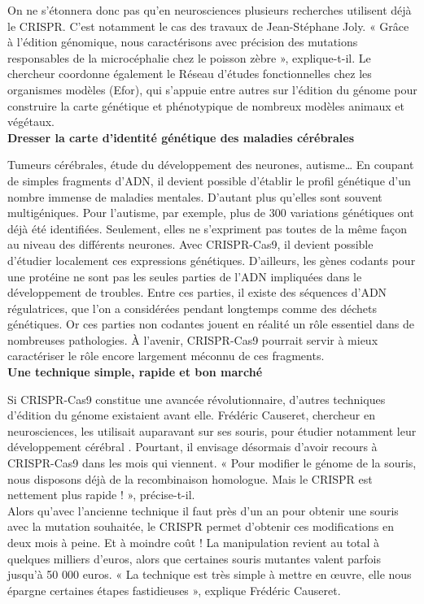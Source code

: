 \documentclass[8pt]{article}
\begin{document}
On ne s’étonnera donc pas qu’en neurosciences plusieurs recherches utilisent déjà le CRISPR. C’est notamment le cas des travaux de Jean-Stéphane Joly. « Grâce à l’édition génomique, nous caractérisons avec précision des mutations responsables de la microcéphalie chez le poisson zèbre », explique-t-il. Le chercheur coordonne également le Réseau d’études fonctionnelles chez les organismes modèles (Efor), qui s’appuie entre autres sur l’édition du génome pour construire la carte génétique et phénotypique de nombreux modèles animaux et végétaux.  \\

\textbf{Dresser la carte d’identité génétique des maladies cérébrales}

Tumeurs cérébrales, étude du développement des neurones, autisme… En coupant de simples fragments d’ADN, il devient possible d’établir le profil génétique d’un nombre immense de maladies mentales. D’autant plus qu’elles sont souvent multigéniques. Pour l’autisme, par exemple, plus de 300 variations génétiques ont déjà été identifiées. Seulement, elles ne s’expriment pas toutes de la même façon au niveau des différents neurones. Avec CRISPR-Cas9, il devient possible d'étudier localement ces expressions génétiques. D’ailleurs, les gènes codants pour une protéine ne sont pas les seules parties de l’ADN impliquées dans le développement de troubles. Entre ces parties, il existe des séquences d’ADN régulatrices, que l’on a considérées pendant longtemps comme des déchets génétiques. Or ces parties non codantes jouent en réalité un rôle essentiel dans de nombreuses pathologies. À l’avenir, CRISPR-Cas9 pourrait servir à mieux caractériser le rôle encore largement méconnu de ces fragments.  \\

\textbf{Une technique simple, rapide et bon marché}

Si CRISPR-Cas9 constitue une avancée révolutionnaire, d’autres techniques d’édition du génome existaient avant elle. Frédéric Causeret, chercheur en neurosciences, les utilisait auparavant sur ses souris, pour étudier notamment leur développement cérébral . Pourtant, il envisage désormais d’avoir recours à CRISPR-Cas9 dans les mois qui viennent. « Pour modifier le génome de la souris, nous disposons déjà de la recombinaison homologue. Mais le CRISPR est nettement plus rapide ! », précise-t-il.  \\

Alors qu’avec l’ancienne technique il faut près d’un an pour obtenir une souris avec la mutation souhaitée, le CRISPR permet d’obtenir ces modifications en deux mois à peine. Et à moindre coût ! La manipulation revient au total à quelques milliers d’euros, alors que certaines souris mutantes valent parfois jusqu’à 50 000 euros. « La technique est très simple à mettre en œuvre, elle nous épargne certaines étapes fastidieuses », explique Frédéric Causeret.  \\
\end{document}
